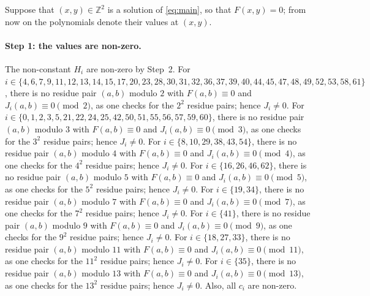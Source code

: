 \documentclass[11pt]{article}
\newcommand{\Z}{\mathbb{Z}}
\begin{document}
Suppose that $(x,y)\in\Z^2$ is a solution of \eqref{eq:main}, so that $F(x,y)=0$; from now on the polynomials denote their values at $(x,y)$.
\paragraph{Step 1: the values are non-zero.} The non-constant $H_i$ are non-zero by Step~2. For $i\in\{4,\allowbreak 6,\allowbreak 7,\allowbreak 9,\allowbreak 11,\allowbreak 12,\allowbreak 13,\allowbreak 14,\allowbreak 15,\allowbreak 17,\allowbreak 20,\allowbreak 23,\allowbreak 28,\allowbreak 30,\allowbreak 31,\allowbreak 32,\allowbreak 36,\allowbreak 37,\allowbreak 39,\allowbreak 40,\allowbreak 44,\allowbreak 45,\allowbreak 47,\allowbreak 48,\allowbreak 49,\allowbreak 52,\allowbreak 53,\allowbreak 58,\allowbreak 61\}$, there is no residue pair $(a,b)$ modulo $2$ with $F(a,b)\equiv0$ and $J_i(a,b)\equiv0\pmod{2}$, as one checks for the $2^2$ residue pairs; hence $J_i\neq0$. For $i\in\{0,\allowbreak 1,\allowbreak 2,\allowbreak 3,\allowbreak 5,\allowbreak 21,\allowbreak 22,\allowbreak 24,\allowbreak 25,\allowbreak 42,\allowbreak 50,\allowbreak 51,\allowbreak 55,\allowbreak 56,\allowbreak 57,\allowbreak 59,\allowbreak 60\}$, there is no residue pair $(a,b)$ modulo $3$ with $F(a,b)\equiv0$ and $J_i(a,b)\equiv0\pmod{3}$, as one checks for the $3^2$ residue pairs; hence $J_i\neq0$. For $i\in\{8,\allowbreak 10,\allowbreak 29,\allowbreak 38,\allowbreak 43,\allowbreak 54\}$, there is no residue pair $(a,b)$ modulo $4$ with $F(a,b)\equiv0$ and $J_i(a,b)\equiv0\pmod{4}$, as one checks for the $4^2$ residue pairs; hence $J_i\neq0$. For $i\in\{16,\allowbreak 26,\allowbreak 46,\allowbreak 62\}$, there is no residue pair $(a,b)$ modulo $5$ with $F(a,b)\equiv0$ and $J_i(a,b)\equiv0\pmod{5}$, as one checks for the $5^2$ residue pairs; hence $J_i\neq0$. For $i\in\{19,\allowbreak 34\}$, there is no residue pair $(a,b)$ modulo $7$ with $F(a,b)\equiv0$ and $J_i(a,b)\equiv0\pmod{7}$, as one checks for the $7^2$ residue pairs; hence $J_i\neq0$. For $i\in\{41\}$, there is no residue pair $(a,b)$ modulo $9$ with $F(a,b)\equiv0$ and $J_i(a,b)\equiv0\pmod{9}$, as one checks for the $9^2$ residue pairs; hence $J_i\neq0$. For $i\in\{18,\allowbreak 27,\allowbreak 33\}$, there is no residue pair $(a,b)$ modulo $11$ with $F(a,b)\equiv0$ and $J_i(a,b)\equiv0\pmod{11}$, as one checks for the $11^2$ residue pairs; hence $J_i\neq0$. For $i\in\{35\}$, there is no residue pair $(a,b)$ modulo $13$ with $F(a,b)\equiv0$ and $J_i(a,b)\equiv0\pmod{13}$, as one checks for the $13^2$ residue pairs; hence $J_i\neq0$. Also, all $c_i$ are non-zero.
\end{document}
